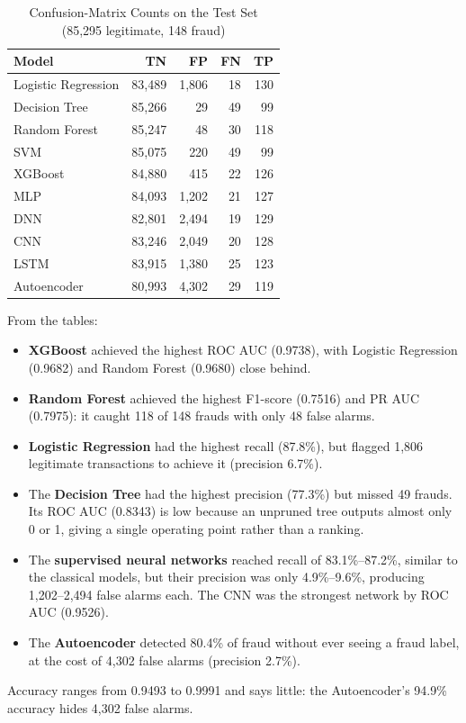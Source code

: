 \documentclass[journal]{IEEEtran}
\begin{document}
\begin{table}[!t]
\centering
\caption{Confusion-Matrix Counts on the Test Set (85,295 legitimate, 148 fraud)}
\label{tab:cm}
\begin{tabular}{@{}lrrrr@{}}
\toprule
Model & TN & FP & FN & TP \\
\midrule
Logistic Regression & 83,489 & 1,806 & 18 & 130 \\
Decision Tree & 85,266 & 29 & 49 & 99 \\
Random Forest & 85,247 & 48 & 30 & 118 \\
SVM & 85,075 & 220 & 49 & 99 \\
XGBoost & 84,880 & 415 & 22 & 126 \\
MLP & 84,093 & 1,202 & 21 & 127 \\
DNN & 82,801 & 2,494 & 19 & 129 \\
CNN & 83,246 & 2,049 & 20 & 128 \\
LSTM & 83,915 & 1,380 & 25 & 123 \\
Autoencoder & 80,993 & 4,302 & 29 & 119 \\
\bottomrule
\end{tabular}
\end{table}

From the tables:
\begin{itemize}
  \item \textbf{XGBoost} achieved the highest ROC AUC (0.9738), with Logistic Regression (0.9682) and Random Forest (0.9680) close behind.
  \item \textbf{Random Forest} achieved the highest F1-score (0.7516) and PR AUC (0.7975): it caught 118 of 148 frauds with only 48 false alarms.
  \item \textbf{Logistic Regression} had the highest recall (87.8\%), but flagged 1,806 legitimate transactions to achieve it (precision 6.7\%).
  \item The \textbf{Decision Tree} had the highest precision (77.3\%) but missed 49 frauds. Its ROC AUC (0.8343) is low because an unpruned tree outputs almost only 0 or 1, giving a single operating point rather than a ranking.
  \item The \textbf{supervised neural networks} reached recall of 83.1\%--87.2\%, similar to the classical models, but their precision was only 4.9\%--9.6\%, producing 1,202--2,494 false alarms each. The CNN was the strongest network by ROC AUC (0.9526).
  \item The \textbf{Autoencoder} detected 80.4\% of fraud without ever seeing a fraud label, at the cost of 4,302 false alarms (precision 2.7\%).
\end{itemize}
Accuracy ranges from 0.9493 to 0.9991 and says little: the Autoencoder's 94.9\% accuracy hides 4,302 false alarms.
\end{document}

